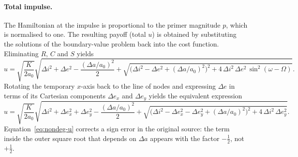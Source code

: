 \documentclass[12pt]{article}
\begin{document}
\paragraph{Total impulse.}  The Hamiltonian at the impulse is
proportional to the primer magnitude $p$, which is normalised to one.
The resulting payoff (total $u$) is obtained by substituting the
solutions of the boundary-value problem back into the cost function.
Eliminating $R$, $C$ and $S$ yields
\begin{equation}
  u = \sqrt{\frac{K}{2a_0}}
      \sqrt{\Delta i^2 + \Delta e^2 - \frac{(\Delta a/a_0)^2}{2}
      + \sqrt{\bigl(\Delta i^2 - \Delta e^2 + (\Delta a/a_0)^2\bigr)^2
              + 4\,\Delta i^2\,\Delta e^2\,\sin^2(\omega-\Omega)}}.
  \tag{B15}\label{eq:nondeg-u-general}
\end{equation}
Rotating the temporary $x$-axis back to the line of nodes and
expressing $\Delta e$ in terms of its Cartesian components
$\Delta e_x$ and $\Delta e_y$ yields the equivalent expression
\begin{equation}
  u = \sqrt{\frac{K}{2a_0}}
      \sqrt{\Delta i^2 + \Delta e_x^2 + \Delta e_y^2
            - \frac{(\Delta a/a_0)^2}{2}
            + \sqrt{\bigl(\Delta i^2 - \Delta e_x^2 - \Delta e_y^2
                        + (\Delta a/a_0)^2\bigr)^2
                    + 4\,\Delta i^2\,\Delta e_y^2}}.
  \tag{B16}\label{eq:nondeg-u}
\end{equation}
Equation~\eqref{eq:nondeg-u} corrects a sign error in the original
source: the term inside the outer square root that depends on
$\Delta a$ appears with the factor $-\tfrac12$, not $+\tfrac12$.
\end{document}
